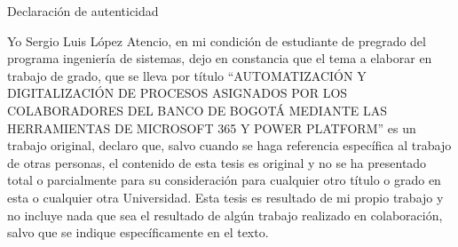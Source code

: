 
\begin{prologo}{Declaración de autenticidad}
	
	Yo Sergio Luis López Atencio, en mi condición de estudiante de pregrado del programa ingeniería de sistemas, dejo en constancia que el tema a elaborar en trabajo de grado, que se lleva por título ``AUTOMATIZACIÓN Y DIGITALIZACIÓN DE PROCESOS ASIGNADOS POR LOS COLABORADORES DEL BANCO DE BOGOTÁ MEDIANTE LAS HERRAMIENTAS
	DE MICROSOFT 365 Y POWER PLATFORM'' es un trabajo original, declaro que, salvo cuando se haga referencia específica al trabajo de otras personas, el contenido de esta tesis es original y no se ha presentado total o parcialmente para su consideración para cualquier otro título o grado en esta o cualquier otra Universidad. Esta tesis es resultado de mi propio trabajo y no incluye nada que sea el resultado de algún trabajo realizado en colaboración, salvo que se indique específicamente en el texto.
	
\end{prologo}
